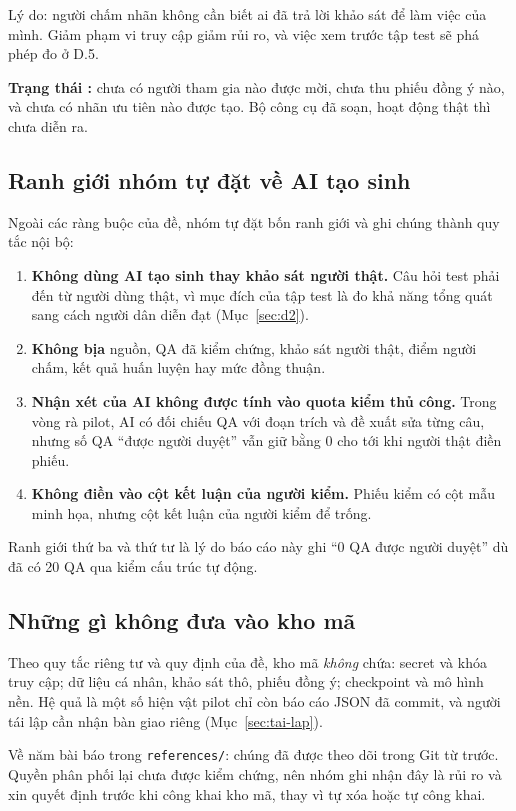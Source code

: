 Lý do: người chấm nhãn không cần biết ai đã trả lời khảo sát để làm việc của mình.
Giảm phạm vi truy cập giảm rủi ro, và việc xem trước tập test sẽ phá phép đo ở D.5.

\textbf{Trạng thái \chualam:} chưa có người tham gia nào được mời, chưa thu phiếu
đồng ý nào, và chưa có nhãn ưu tiên nào được tạo. Bộ công cụ đã soạn, hoạt động
thật thì chưa diễn ra.

\subsection{Ranh giới nhóm tự đặt về AI tạo sinh}

Ngoài các ràng buộc của đề, nhóm tự đặt bốn ranh giới và ghi chúng thành quy tắc
nội bộ:

\begin{enumerate}[leftmargin=2em]
\item \textbf{Không dùng AI tạo sinh thay khảo sát người thật.} Câu hỏi test phải
đến từ người dùng thật, vì mục đích của tập test là đo khả năng tổng quát sang cách
người dân diễn đạt (Mục~\ref{sec:d2}).
\item \textbf{Không bịa} nguồn, QA đã kiểm chứng, khảo sát người thật, điểm người
chấm, kết quả huấn luyện hay mức đồng thuận.
\item \textbf{Nhận xét của AI không được tính vào quota kiểm thủ công.} Trong vòng
rà pilot, AI có đối chiếu QA với đoạn trích và đề xuất sửa từng câu, nhưng số QA
``được người duyệt'' vẫn giữ bằng $0$ cho tới khi người thật điền phiếu.
\item \textbf{Không điền vào cột kết luận của người kiểm.} Phiếu kiểm có cột mẫu
minh họa, nhưng cột kết luận của người kiểm để trống.
\end{enumerate}

Ranh giới thứ ba và thứ tư là lý do báo cáo này ghi ``0 QA được người duyệt'' dù đã
có 20 QA qua kiểm cấu trúc tự động.

\subsection{Những gì không đưa vào kho mã}

Theo quy tắc riêng tư và quy định của đề, kho mã \emph{không} chứa: secret và khóa
truy cập; dữ liệu cá nhân, khảo sát thô, phiếu đồng ý; checkpoint và mô hình nền.
Hệ quả là một số hiện vật pilot chỉ còn báo cáo JSON đã commit, và người tái lập
cần nhận bàn giao riêng (Mục~\ref{sec:tai-lap}).

Về năm bài báo trong \texttt{references/}: chúng đã được theo dõi trong Git từ
trước. Quyền phân phối lại chưa được kiểm chứng, nên nhóm ghi nhận đây là rủi ro và
xin quyết định trước khi công khai kho mã, thay vì tự xóa hoặc tự công khai.

